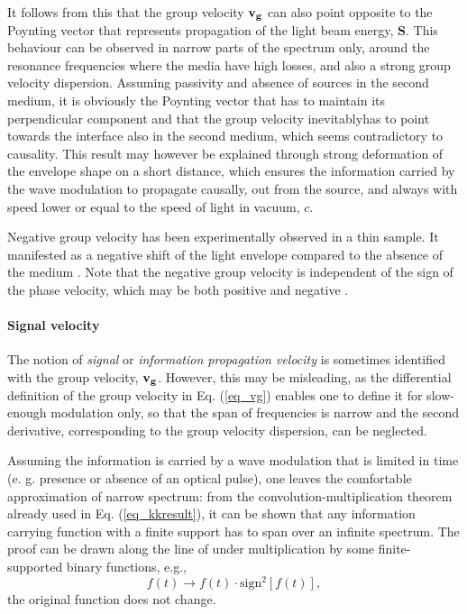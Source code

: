 It follows from this that the group velocity ${\mathbf{v_g}}$ can also point opposite to the Poynting vector that represents propagation of the light beam energy, $\mathbf{S}$. 
This behaviour can be observed in narrow parts of the spectrum only, around the resonance frequencies where the media have high losses, and also a strong group velocity dispersion.
Assuming passivity and absence of sources in the second medium, it is obviously the Poynting vector that has to maintain its perpendicular component and that the group velocity   inevitablyhas to point towards the interface also in the second medium, which seems contradictory to causality.
This result 
may however be explained through strong deformation of the envelope shape on a short distance, which ensures the information carried by the wave modulation to propagate causally, out from the source, and always with speed lower or equal to the speed of light in vacuum, $c$.

Negative group velocity has been experimentally observed in a thin sample. It manifested as a negative shift of the light envelope compared to the absence of the medium \cite{dolling2006simultaneous}. Note that the negative group velocity is independent of the sign of the phase velocity, which may be both positive and negative \cite{mikki2009electromagnetic}.

\paragraph{Signal velocity}%
The notion of \textit{signal} or \textit{information propagation velocity} is sometimes %
identified with the group velocity, ${\mathbf{v_g}}$. However, this may be misleading, as the differential definition of the group velocity in Eq. (\ref{eq_vg}) enables one to define it for slow-enough modulation only, so that the span of frequencies is narrow and the second derivative, corresponding to the group velocity dispersion, can be neglected.

Assuming the information is carried by a wave modulation that is limited in time (e. g. presence or absence of an optical pulse), one leaves the comfortable approximation of narrow spectrum: from the convolution-multiplication theorem already used in Eq. (\ref{eq_kkresult}), it can be shown that any information carrying function with a finite support has to span over an infinite spectrum. The proof can be drawn along the line of under multiplication by some finite-supported binary functions, e.g., $$ f(t) \rightarrow f(t) \cdot \mathrm{sign}^2[f(t)], $$
the original function does not change.

